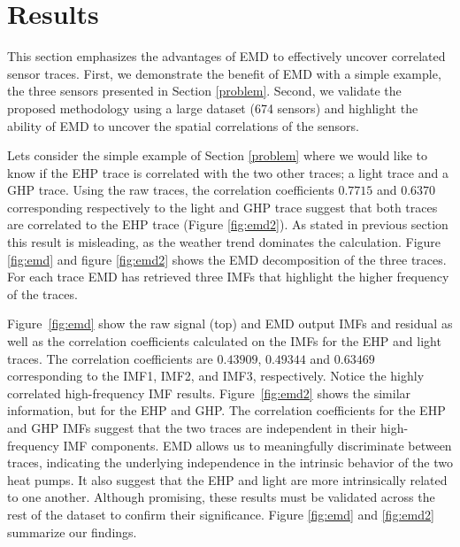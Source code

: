 \section{Results}




This section emphasizes the advantages of EMD to effectively uncover correlated sensor traces.
First, we demonstrate the benefit of EMD with a simple example, the three sensors presented in Section \ref{problem}.
Second, we validate the proposed methodology using a large dataset (674 sensors) and highlight the ability of EMD to uncover the spatial correlations of the sensors.

Lets consider the simple example of Section \ref{problem} where we would like to know if the EHP trace is correlated with the two other traces; a light trace and a GHP trace.
Using the raw traces, the correlation coefficients $0.7715$ and $0.6370$ corresponding respectively to the light and GHP trace suggest that both traces are correlated to the EHP trace (Figure \ref{fig:emd2}).
As stated in previous section this result is misleading, as the weather trend dominates the calculation.
Figure \ref{fig:emd} and figure \ref{fig:emd2} shows the EMD decomposition of the three traces.
For each trace EMD has retrieved three IMFs that highlight the higher frequency of the traces.

Figure~\ref{fig:emd} show the raw signal (top) and EMD output IMFs and residual as well as the 
correlation coefficients calculated on the IMFs for the EHP and
light traces.  The correlation coefficients are $0.43909$, $0.49344$ and $0.63469$ corresponding to the IMF1, 
IMF2, and IMF3, respectively.  Notice the highly correlated high-frequency IMF results.
Figure~\ref{fig:emd2} shows the similar information, but for the EHP and GHP.
The correlation coefficients for the EHP and GHP IMFs suggest that the two traces are independent in their 
high-frequency IMF components.
EMD allows us to meaningfully discriminate between traces, indicating the underlying independence in the intrinsic
behavior of the two heat pumps.  It also suggest that the EHP and light are more intrinsically related
to one another.  Although promising, these results must be validated across the rest of the
dataset to confirm their significance.  Figure \ref{fig:emd} and \ref{fig:emd2} summarize our findings.

